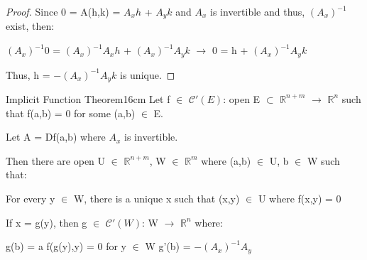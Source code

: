     \begin{proof}
        Since 0 = A(h,k) = $A_xh$ + $A_yk$ and $A_x$ is invertible
        and thus, $(A_x)^{-1}$ exist, then:
        
        \hspace{0.5cm}
        $(A_x)^{-1}$0 = $(A_x)^{-1}A_xh$ + $(A_x)^{-1}A_yk$
        \hspace{0.5cm}
        $\rightarrow$
        \hspace{0.5cm}
        0 = h + $(A_x)^{-1}A_yk$

        Thus, h = $-(A_x)^{-1}A_yk$ is unique.
    \end{proof}

    \vspace{0.5cm}




    \begin{wtheorem}{Implicit Function Theorem}{16cm}
        Let f $\in$ $\mathscr{C}'(E)$: open E $\subset$ $\mathbb{R}^{n+m}$
        $\rightarrow$ $\mathbb{R}^n$ such that f(a,b) = 0
        for some (a,b) $\in$ E.

        Let A = Df(a,b) where $A_x$ is invertible.
        
        Then there are open U $\in$ $\mathbb{R}^{n+m}$, W $\in$ $\mathbb{R}^m$
        where (a,b) $\in$ U, b $\in$ W such that:

        \hspace{0.5cm}
        For every y $\in$ W, there is a unique x such that (x,y) $\in$ U
        where f(x,y) = 0

        If x = g(y), then g $\in$ $\mathscr{C}'(W)$: W
        $\rightarrow$ $\mathbb{R}^n$ where:
        
        \hspace{0.5cm}
        g(b) = a
        \hspace{1cm}
        f(g(y),y) = 0 for y $\in$ W
        \hspace{1cm}
        g'(b) = $-(A_x)^{-1}A_y$
    \end{wtheorem}

